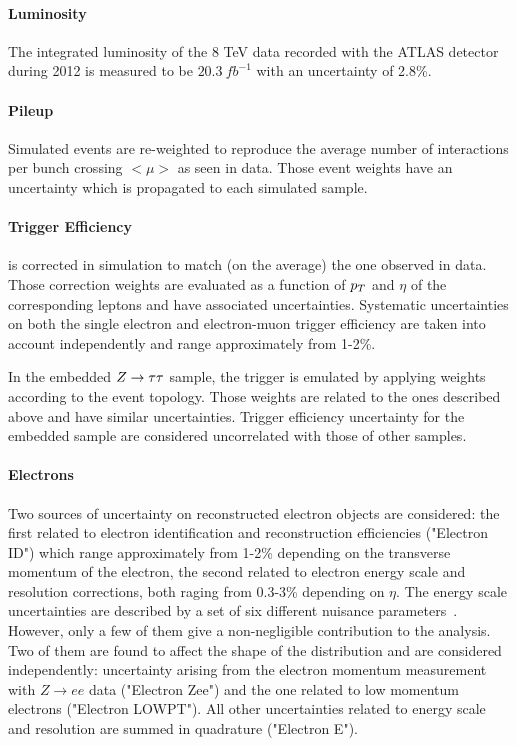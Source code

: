 \paragraph{Luminosity}
The integrated luminosity of the 8 TeV data recorded with the ATLAS detector during 2012 is measured 
to be $20.3 ~ fb^{-1}$ \cite{luminosity} with an uncertainty  of  2.8\%.

\paragraph{Pileup}
Simulated events are re-weighted to reproduce the average number of interactions per bunch crossing $<\mu>$ as seen in data. 
Those event weights have an uncertainty which is propagated to each simulated sample.

\paragraph{Trigger Efficiency}
is corrected in simulation to match (on the average) the one observed in data. Those correction weights 
are evaluated as a function of $p_{T}$ and $\eta$ of the corresponding leptons and have associated uncertainties. 
Systematic uncertainties on both the single electron and electron-muon trigger efficiency are taken into account 
independently and range approximately from 1-2\%.

In the embedded $Z\rightarrow \tau\tau$ sample, the trigger is emulated by applying weights  according to  the event
topology. Those weights are related to the ones described above
and have similar uncertainties. Trigger efficiency uncertainty for the embedded sample 
 are considered uncorrelated with those of other samples.

\paragraph{Electrons}
Two sources of uncertainty on reconstructed electron objects are considered:
the first  related to electron identification and reconstruction efficiencies ("Electron ID") which range approximately from 1-2\%
depending on the transverse momentum of the electron, 
the second related to electron energy scale  and resolution corrections, both raging from 0.3-3\% depending on $\eta$. 
The energy scale uncertainties are described by a set of six different nuisance parameters~\cite{eleEnergy}.
However, only a few of them give a non-negligible contribution to the analysis. Two of them are found
to affect the shape of the \mmc distribution and are considered independently: uncertainty
arising from the electron  momentum measurement with $Z \rightarrow ee$ data ("Electron Zee") 
and the one related to low momentum electrons ("Electron LOWPT"). 
All other uncertainties related to energy scale and resolution are summed in quadrature ("Electron E").

